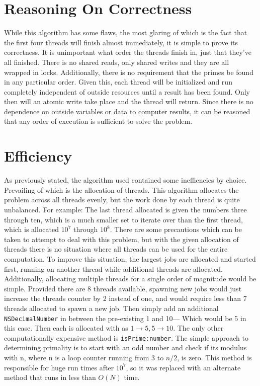 \documentclass[12pt]{article}
\begin{document}
\section{Reasoning On Correctness}
While this algorithm has some flaws, the most glaring of which is the fact that the first four threads will finish almost immediately, it is simple to prove its correctness. It is unimportant what order the threads finish in, just that they've all finished.  There is no shared reads, only shared writes and they are all wrapped in locks. Additionally, there is no requirement that the primes be found in any particular order.  Given this, each thread will be initialized and run completely independent of outside resources until a result has been found.  Only then will an atomic write take place and the thread will return.  Since there is no dependence on outside variables or data to computer results, it can be reasoned that any order of execution is sufficient to solve the problem.

\section{Efficiency}
As previously stated, the algorithm used contained some ineffiencies by choice.  Prevailing of which is the allocation of threads.  This algorithm allocates the problem across all threads evenly, but the work done by each thread is quite unbalanced.  For example: The last thread allocated is given the numbers three through ten, which is a much smaller set to iterate over than the first thread, which is allocated $10^7$ through $10^8$.  There are some precautions which can be taken to attempt to deal with this problem, but with the given allocation of threads there is no situation where all threads can be used for the entire computation.  To improve this situation, the largest jobs are allocated and started first, running on another thread while additional threads are allocated.  Additionally, allocating multiple threads for a single order of magnitude would be simple.  Provided there are 8 threads available, spawning new jobs would just increase the threads counter by 2 instead of one, and would require less than 7 threads allocated to spawn a new job.  Then simply add an additional \texttt{NSDecimalNumber} in between the pre-existing 1 and 10--- Which would be 5 in this case. Then each is allocated with as $1 \rightarrow 5, 5 \rightarrow 10$.
\newline\newline
The only other computationally expensive method is \texttt{isPrime:number}. The simple approach to determining primality is to start with an odd number and check if its modulus with n, where n is a loop counter running from 3 to $n/2$, is zero. This method is responsible for huge run times after $10^7$, so it was replaced with an alternate method that runs in less than $O(N)$ time. 
\end{document}
